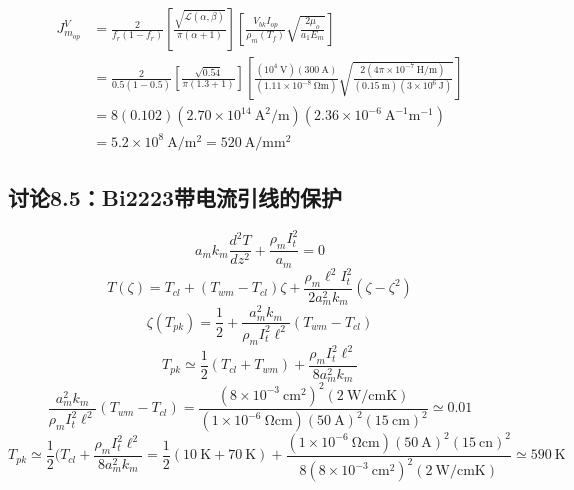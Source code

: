 \begin{align*}%
J_{m_{op}}^{V}&=\frac{2}{f_r(1-f_r)}\left[\frac{\sqrt{\mathcal{L}(\alpha,\beta)}}{\pi(\alpha+1)}\right]\left[\frac{V_{bk}I_{op}}{\rho_m(T_f)}\sqrt{\frac{2\mu_o}{a_1E_m}}\right] \\
&=\frac{2}{0.5(1-0.5)}\left[\frac{\sqrt{0.54}}{\pi(1.3+1)}\right]\left[\frac{(10^4\ \mathrm{V})(300\ \mathrm{A})}{(1.11\times 10^{-8}\ \mathrm{\Omega m})}\sqrt{\frac{2(4\pi\times 10^{-7}\ \mathrm{H/m})}{(0.15\ \mathrm{m})(3\times 10^6\ \mathrm{J})}}\right] \\
&=8(0.102)(2.70\times 10^{14}\ \mathrm{A^2/m})(2.36\times 10^{-6}\ \mathrm{A^{-1}m^{-1}}) \\
&=5.2\times 10^8\ \mathrm{A/m^2}=520\ \mathrm{A/mm^2}
\end{align*}


\subsection{讨论8.5：Bi2223带电流引线的保护}

\begin{equation}%
a_mk_m\frac{d^2T}{dz^2}+\frac{\rho_mI_{t}^{2}}{a_m}=0
\end{equation}
\begin{equation}%
T(\zeta)=T_{cl}+(T_{wm}-T_{cl})\zeta+\frac{\rho_m\ell^2I_{t}^{2}}{2a_{m}^{2}k_m}(\zeta-\zeta^2)
\end{equation}
\begin{equation}%
\zeta(T_{pk})=\frac{1}{2}+\frac{a_{m}^{2}k_m}{\rho_mI_{t}^{2}\ell^2}(T_{wm}-T_{cl})
\end{equation}
\begin{equation}%
T_{pk}\simeq \frac{1}{2}(T_{cl}+T_{wm})+\frac{\rho_mI_{t}^{2}\ell^2}{8a_{m}^{2}k_m}
\end{equation}
\begin{equation}%
\frac{a_{m}^{2}k_m}{\rho_mI_{t}^{2}\ell^2}(T_{wm}-T_{cl})=\frac{(8\times 10^{-3}\ \mathrm{cm^2})^2(2\ \mathrm{W/cm K})}{(1\times 10^{-6}\ \mathrm{\Omega cm})(50\ \mathrm{A})^2(15\ \mathrm{cm})^2} 
\simeq 0.01
\end{equation}
\begin{equation}%
T_{pk}\simeq\frac{1}{2}(T_{cl}+\frac{\rho_mI_{t}^{2}\ell^2}{8a_{m}^{2}k_m} 
=\frac{1}{2}(10\ \mathrm{K}+70\ \mathrm{K})+\frac{(1\times 10^{-6}\ \mathrm{\Omega cm})(50\ \mathrm{A})^2(15\ \mathrm{cn})^2}{8(8\times 10^{-3}\ \mathrm{cm^2})^2(2\ \mathrm{W/cm K})}\simeq 590\ \mathrm{K}
\end{equation}



